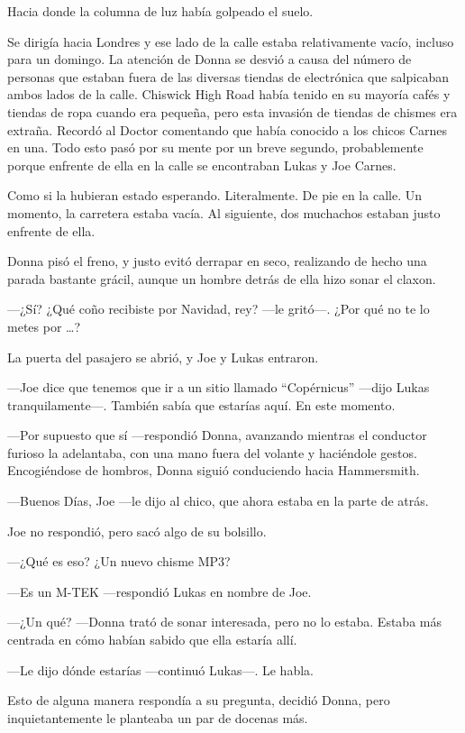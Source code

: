 Hacia donde la columna de luz había golpeado el suelo.

Se dirigía hacia Londres y ese lado de la calle estaba relativamente
vacío, incluso para un domingo. La atención de Donna se desvió a causa
del número de personas que estaban fuera de las diversas tiendas de
electrónica que salpicaban ambos lados de la calle. Chiswick High Road
había tenido en su mayoría cafés y tiendas de ropa cuando era pequeña,
pero esta invasión de tiendas de chismes era extraña. Recordó al Doctor
comentando que había conocido a los chicos Carnes en una. Todo esto pasó
por su mente por un breve segundo, probablemente porque enfrente de ella
en la calle se encontraban Lukas y Joe Carnes.

Como si la hubieran estado esperando. Literalmente. De pie en la calle.
Un momento, la carretera estaba vacía. Al siguiente, dos muchachos
estaban justo enfrente de ella.

Donna pisó el freno, y justo evitó derrapar en seco, realizando de hecho
una parada bastante grácil, aunque un hombre detrás de ella hizo sonar
el claxon.

---¿Sí? ¿Qué coño recibiste por Navidad, rey? ---le gritó---. ¿Por qué
no te lo metes por \ldots{}?

La puerta del pasajero se abrió, y Joe y Lukas entraron.

---Joe dice que tenemos que ir a un sitio llamado ``Copérnicus'' ---dijo
Lukas tranquilamente---. También sabía que estarías aquí. En este
momento.

---Por supuesto que sí ---respondió Donna, avanzando mientras el
conductor furioso la adelantaba, con una mano fuera del volante y
haciéndole gestos. Encogiéndose de hombros, Donna siguió conduciendo
hacia Hammersmith.

---Buenos Días, Joe ---le dijo al chico, que ahora estaba en la parte de
atrás.

Joe no respondió, pero sacó algo de su bolsillo.

---¿Qué es eso? ¿Un nuevo chisme MP3?

---Es un M-TEK ---respondió Lukas en nombre de Joe.

---¿Un qué? ---Donna trató de sonar interesada, pero no lo estaba.
Estaba más centrada en cómo habían sabido que ella estaría allí.

---Le dijo dónde estarías ---continuó Lukas---. Le habla.

Esto de alguna manera respondía a su pregunta, decidió Donna, pero
inquietantemente le planteaba un par de docenas más.

